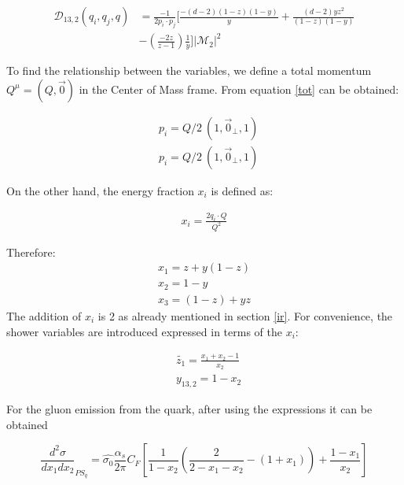 \begin{equation}
\begin{split}
\mathcal{D}_{13,2} (q_i,q_j,q) &= \frac{-1}{2p_i \cdot p_j}[\frac{-(d-2)(1-z)(1-y) }{y}+\frac{(d-2)yz^2}{(1-z)(1-y)}\\
&-(\frac{-2z}{z-1}) \frac{1}{y}]|\mathcal{M}_{2}|^2
\end{split}
\end{equation}

To find the relationship between the variables, we define a total momentum $Q^{\mu} = (Q, \overrightarrow{0})$ in the Center of Mass frame.
From equation \ref{tot} can be obtained:

\begin{equation}
\begin{split}
&p_i = Q/2\:(1, \overrightarrow{0}_\bot, 1)\\
&p_i = Q/2\:(1, \overrightarrow{0}_\bot, 1)
\end{split}
\end{equation}

On the other hand, the energy fraction $ x_i $ is defined as:

\begin{equation}
\begin{split}
x_i = \frac{2 q_i \cdot Q}{Q^2}
\end{split}
\end{equation}

Therefore:
\begin{equation}
\begin{split}
x_1 = z + y(1-z)\\
x_2 = 1-y\\
x_3 = (1-z)+yz
\end{split}
\end{equation}
The addition of $x_i$ is 2 as already mentioned in section \ref{ir}.
For convenience, the shower variables are introduced expressed in terms of the $ x_i $:

\begin{equation}
\begin{split}
&\tilde{z_1}=\frac{x_1+x_2-1}{x_2}\\
&y_{13,2} =1-x_2
\end{split}
\end{equation}

For the gluon emission from the quark, after using the expressions it can be obtained \cite{Schumann:2007mg}

\begin{equation}
\frac{d^2 \sigma}{dx_1 dx_2}_{PS_q}= \hat{\sigma_0}
\frac{\alpha_s}{2\pi} C_F [\frac{1}{1-x_2} (\frac{2}{2-x_1-x_2}-(1+x_1))+\frac{1-x_1}{x_2}]
\end{equation}

